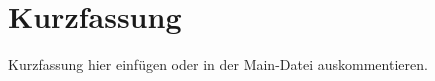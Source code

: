 \chapter*{Kurzfassung}

Kurzfassung hier einfügen oder \verb++ in der Main-Datei auskommentieren.
\cleardoublepage